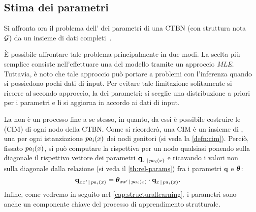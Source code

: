 \subsection{Stima dei parametri}\label{subsec:ctbn-params}
Si affronta ora il problema dell' dei parametri di una \acl{CTBN} (con struttura nota $\mathcal{G}$) da un insieme di dati completi~\citep[si veda][sezione 5.1]{Nodelman2007}.

\`E possibile affrontare tale problema principalmente in due modi. La scelta più semplice consiste nell'effettuare una  del modello tramite un approccio \emph{\acl{MLE}}. Tuttavia, è noto che tale approccio può portare a problemi con l'inferenza quando si possiedono pochi dati di input. Per evitare tale limitazione solitamente si ricorre al secondo approccio, la \emph{} dei parametri: si sceglie una distribuzione a priori per i parametri e li si aggiorna in accordo ai dati di input.

La  non è un processo fine a se stesso, in quanto,  da essi è possibile costruire le \cim{} (\acs{CIM}) di ogni nodo della \acs{CTBN}. Come si ricorderà, una \acs{CIM} è un insieme di \im{}, una per ogni istanziazione $pa_i(\mathnormal{x})$ dei nodi genitori (si veda la \autoref{defn:cim}). Perciò, fissato $pa_i(\mathnormal{x})$, si può computare la rispettiva \im*{} per un nodo qualsiasi ponendo sulla diagonale il rispettivo vettore dei parametri $\boldsymbol{\textbf{\text{q}}}_{\mathnormal{x}\,\arrowvert\,pa_i(\mathnormal{x})}$ e ricavando i valori non sulla diagonale dalla relazione (si veda il \autoref{th:rel-params}) fra i parametri $\boldsymbol{\textbf{\text{q}}}$ e $\boldsymbol{\textbf{\text{$\theta$}}}$:
\begin{equation}
\label{eq:ctbn-params-rel}
\boldsymbol{\textbf{\text{q}}}_{\mathnormal{x}\mathnormal{x}^\prime\,\arrowvert\,pa_i(\mathnormal{x})}=\boldsymbol{\textbf{\text{$\theta$}}}_{\mathnormal{x}\mathnormal{x}^\prime\,\arrowvert\,pa_i(\mathnormal{x})} \cdot \boldsymbol{\textbf{\text{q}}}_{\mathnormal{x}\,\arrowvert\,pa_i(\mathnormal{x})}\text{.}
\end{equation}
Infine, come vedremo in seguito nel \autoref{cap:structurallearning}, i parametri sono anche un componente chiave del processo di apprendimento strutturale.

